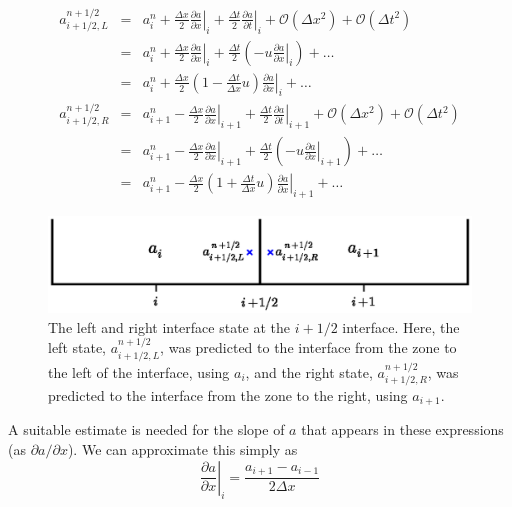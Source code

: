 \begin{eqnarray}
a_{i+1/2,L}^{n+1/2} &=& a_i^n + \frac{\Delta x}{2} \left .\frac{\partial a}{\partial x} \right |_i + \frac{\Delta t}{2} \left .\frac{\partial a}{\partial t} \right |_i + \mathcal{O}(\Delta x^2) + \mathcal{O}(\Delta t^2) \nonumber \\
    &=& a_i^n + \frac{\Delta x}{2} \left .\frac{\partial a}{\partial x} \right |_i +  \frac{\Delta t}{2} \left ( - u \left .\frac{\partial a}{\partial x} \right |_i \right ) + \ldots \nonumber \\
    &=& a_i^n + \frac{\Delta x}{2} \left ( 1 - \frac{\Delta t}{\Delta x} u \right ) \left .\frac{\partial a}{\partial x} \right |_i +  \ldots \label{eq:statel}\\
a_{i+1/2,R}^{n+1/2} &=& a_{i+1}^n - \frac{\Delta x}{2} \left .\frac{\partial a}{\partial x} \right |_{i+1} + \frac{\Delta t}{2} \left .\frac{\partial a}{\partial t} \right |_{i+1} + \mathcal{O}(\Delta x^2) + \mathcal{O}(\Delta t^2) \nonumber \\
    &=& a_{i+1}^n - \frac{\Delta x}{2} \left .\frac{\partial a}{\partial x} \right |_{i+1} +  \frac{\Delta t}{2} \left ( - u \left .\frac{\partial a}{\partial x} \right |_{i+1} \right ) + \ldots \nonumber \\
    &=& a_{i+1}^n - \frac{\Delta x}{2} \left ( 1 + \frac{\Delta t}{\Delta x} u \right ) \left .\frac{\partial a}{\partial x} \right |_{i+1} +  \ldots \label{eq:stater}
\end{eqnarray}
\begin{figure}[t]
\centering
\includegraphics[width=5.0in]{riemann}
\caption[The input state to the Riemann problem]{\label{fig:riemann} The left and right interface state at the
  $i+1/2$ interface.  Here, the left state, $a_{i+1/2,L}^{n+1/2}$, was
  predicted to the interface from the zone to the left of the
  interface, using $a_i$, and the right state, $a_{i+1/2,R}^{n+1/2}$,
  was predicted to the interface from the zone to the right, using
  $a_{i+1}$.}
\end{figure}

A suitable estimate is needed for the slope of $a$ that appears in these 
expressions (as $\partial a/\partial x$).  We can approximate this simply
as 
\begin{equation}
\left . \frac{\partial a}{\partial x}\right |_i = \frac{a_{i+1} - a_{i-1}}{2 \Delta x} \label{eq:slopecentered}
\end{equation}

